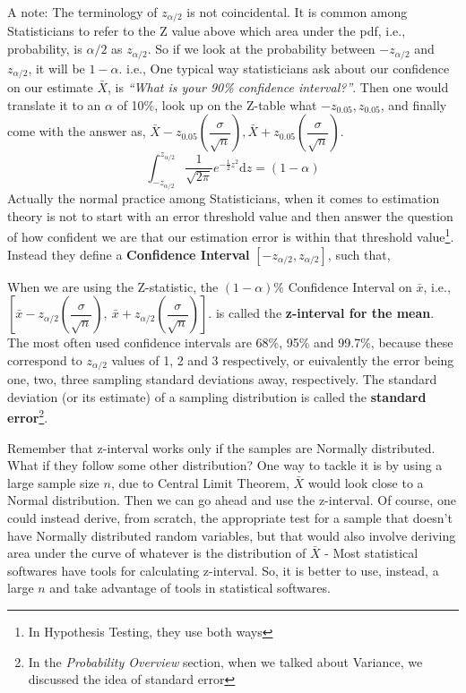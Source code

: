 A note: The terminology of \( z_{\alpha/2} \) is not coincidental. It is common among Statisticians to refer to the Z value above which area under the pdf, i.e., probability, is \( \alpha/2 \) as \( z_{\alpha/2} \). So if we look at the probability between \( -z_{\alpha/2} \) and \( z_{\alpha/2} \), it will be \( 1 - \alpha \). i.e.,
One typical way statisticians ask about our confidence on our estimate \(\bar{X}\), is \emph{``What is your 90\% confidence interval?''}. Then one would translate it to an \(\alpha\) of 10\%, look up on the Z-table what \(-z_{0.05}, z_{0.05}\), and finally come with the answer as, \( \bar{X}-z_{0.05}\left(\dfrac{\sigma}{\sqrt{n}}\right),  \bar{X}+z_{0.05}\left(\dfrac{\sigma}{\sqrt{n}}\right) \).
	\[ \int_{-z_{\alpha/2}}^{z_{\alpha/2}}  \frac{1}{\sqrt{2\pi}} e^{-\frac{1}{2}z^2} \mathrm{d}z  = (1-\alpha)\]
Actually the normal practice among Statisticians, when it comes to estimation theory is not to start with an error threshold value and then answer the question of how confident we are that our estimation error is within that threshold value\footnote{In Hypothesis Testing, they use both ways}. Instead they define a \textbf{Confidence Interval}  \( [-z_{\alpha/2}, z_{\alpha/2}] \), such that,
	
When we are using the Z-statistic, the \( (1-\alpha)\% \) Confidence Interval on $\bar{x}$, i.e.,  \( [ \bar{x} - z_{\alpha/2}\left(\dfrac{\sigma}{\sqrt{n}}\right),\ \bar{x} + z_{\alpha/2}\left(\dfrac{\sigma}{\sqrt{n}}\right) ] \).  is called the \textbf{z-interval for the mean}. The most often used confidence intervals are 68\%, 95\% and 99.7\%, because these correspond to $z_{\alpha/2}$ values of 1, 2 and 3 respectively, or euivalently the error being one, two, three sampling standard deviations away, respectively. The standard deviation (or its estimate) of a sampling distribution is called the \textbf{standard error}\footnote{In the \emph{Probability Overview} section, when we talked about Variance, we discussed the idea of standard error}. 

Remember that z-interval works only if the samples are Normally distributed. What if they follow some other distribution? One way to tackle it is by using a large sample size $n$, due to Central Limit Theorem, $\bar{X}$ would look close to a Normal distribution. Then we can go ahead and use the z-interval. Of course, one could instead derive, from scratch, the appropriate test for a sample that doesn't have Normally distributed random variables, but that would also involve deriving area under the curve of whatever is the distribution of $\bar{X}$ - Most statistical softwares have tools for calculating z-interval. So, it is better to use, instead, a large $n$ and take advantage of tools in statistical softwares.
 
